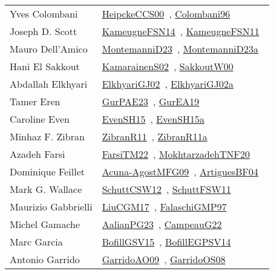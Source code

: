 {\begin{longtable}{p{4cm}p{20cm}}
Yves Colombani & \href{works/HeipckeCCS00.pdf}{HeipckeCCS00}~\cite{HeipckeCCS00}, \href{works/Colombani96.pdf}{Colombani96}~\cite{Colombani96}\\
Joseph D. Scott & \href{works/KameugneFSN14.pdf}{KameugneFSN14}~\cite{KameugneFSN14}, \href{works/KameugneFSN11.pdf}{KameugneFSN11}~\cite{KameugneFSN11}\\
Mauro Dell'Amico & \href{works/MontemanniD23.pdf}{MontemanniD23}~\cite{MontemanniD23}, \href{works/MontemanniD23a.pdf}{MontemanniD23a}~\cite{MontemanniD23a}\\
Hani El Sakkout & \href{works/KamarainenS02.pdf}{KamarainenS02}~\cite{KamarainenS02}, \href{works/SakkoutW00.pdf}{SakkoutW00}~\cite{SakkoutW00}\\
Abdallah Elkhyari & \href{works/ElkhyariGJ02.pdf}{ElkhyariGJ02}~\cite{ElkhyariGJ02}, \href{works/ElkhyariGJ02a.pdf}{ElkhyariGJ02a}~\cite{ElkhyariGJ02a}\\
Tamer Eren & \href{works/GurPAE23.pdf}{GurPAE23}~\cite{GurPAE23}, \href{works/GurEA19.pdf}{GurEA19}~\cite{GurEA19}\\
Caroline Even & \href{works/EvenSH15.pdf}{EvenSH15}~\cite{EvenSH15}, \href{works/EvenSH15a.pdf}{EvenSH15a}~\cite{EvenSH15a}\\
Minhaz F. Zibran & \href{works/ZibranR11.pdf}{ZibranR11}~\cite{ZibranR11}, \href{works/ZibranR11a.pdf}{ZibranR11a}~\cite{ZibranR11a}\\
Azadeh Farsi & \href{works/FarsiTM22.pdf}{FarsiTM22}~\cite{FarsiTM22}, \href{works/MokhtarzadehTNF20.pdf}{MokhtarzadehTNF20}~\cite{MokhtarzadehTNF20}\\
Dominique Feillet & \href{works/Acuna-AgostMFG09.pdf}{Acuna-AgostMFG09}~\cite{Acuna-AgostMFG09}, \href{works/ArtiguesBF04.pdf}{ArtiguesBF04}~\cite{ArtiguesBF04}\\
Mark G. Wallace & \href{works/SchuttCSW12.pdf}{SchuttCSW12}~\cite{SchuttCSW12}, \href{works/SchuttFSW11.pdf}{SchuttFSW11}~\cite{SchuttFSW11}\\
Maurizio Gabbrielli & \href{works/LiuCGM17.pdf}{LiuCGM17}~\cite{LiuCGM17}, \href{works/FalaschiGMP97.pdf}{FalaschiGMP97}~\cite{FalaschiGMP97}\\
Michel Gamache & \href{works/AalianPG23.pdf}{AalianPG23}~\cite{AalianPG23}, \href{works/CampeauG22.pdf}{CampeauG22}~\cite{CampeauG22}\\
Marc Garcia & \href{works/BofillGSV15.pdf}{BofillGSV15}~\cite{BofillGSV15}, \href{works/BofillEGPSV14.pdf}{BofillEGPSV14}~\cite{BofillEGPSV14}\\
Antonio Garrido & \href{works/GarridoAO09.pdf}{GarridoAO09}~\cite{GarridoAO09}, \href{works/GarridoOS08.pdf}{GarridoOS08}~\cite{GarridoOS08}\\

\end{longtable}}
